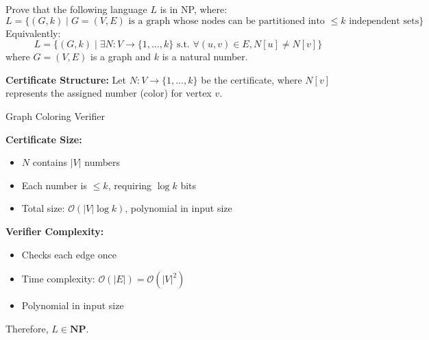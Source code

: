 \begin{ex}
	Prove that the following language $L$ is in NP, where:
	\[L = \{(G,k) \mid G=(V,E) \text{ is a graph whose nodes can be partitioned into } \leq k \text{ independent sets}\}\]
	Equivalently:
	\[L = \{(G,k) \mid \exists N: V \to \{1,\ldots,k\} \text{ s.t. } \forall (u,v) \in E, N[u] \neq N[v]\}\]
	where $G = (V,E)$ is a graph and $k$ is a natural number.
\end{ex}

\begin{solution}
	\textbf{Certificate Structure:}
	Let $N: V \to \{1,\ldots,k\}$ be the certificate, where $N[v]$ represents the assigned number (color) for vertex $v$.

	\begin{algorithm}
		\caption{Graph Coloring Verifier}\label{alg:coloring}
		\;
	\end{algorithm}

	\textbf{Certificate Size:}
	\begin{itemize}
		\item $N$ contains $|V|$ numbers
		\item Each number is $\leq k$, requiring $\log k$ bits
		\item Total size: $\mathcal{O}(|V| \log k)$, polynomial in input size
	\end{itemize}

	\textbf{Verifier Complexity:}
	\begin{itemize}
		\item Checks each edge once
		\item Time complexity: $\mathcal{O}(|E|) = \mathcal{O}(|V|^2)$
		\item Polynomial in input size
	\end{itemize}

	Therefore, $L \in \textbf{NP}$.
\end{solution}

